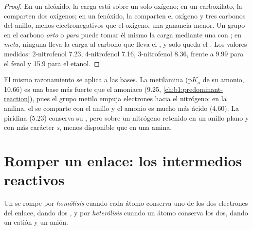 \begin{proof}
En un alcóxido, la carga está sobre un solo oxígeno; en un carboxilato,
la comparten dos oxígenos; en un fenóxido, la comparten el oxígeno y tres
carbonos del anillo, menos electronegativos que el oxígeno, una ganancia
menor. Un grupo  en el carbono \textit{orto} o \textit{para}
puede tomar él mismo la carga mediante una  con
; en \textit{meta}, ninguna  lleva la
carga al carbono que lleva el , y solo queda el . Los valores medidos: 2-nitrofenol 7.23, 4-nitrofenol 7.16,
3-nitrofenol 8.36, frente a 9.99 para el fenol y 15.9 para el etanol.
\end{proof}

El mismo razonamiento se aplica a las bases. La metilamina
($\mathrm{p}K_a$ de su amonio, 10.66) es una base más fuerte que el
amoniaco (9.25, \cref{ch:b1:predominant-reaction}), pues el grupo metilo
empuja electrones hacia el nitrógeno; en la anilina, el 
se comparte con el anillo y el amonio es mucho más ácido (4.60). La
piridina (5.23) conserva su , pero sobre un nitrógeno
retenido en un anillo plano y con más carácter \textit{s}, menos
disponible que en una amina.

\section{Romper un enlace: los intermedios reactivos}

\begin{definition}\label{def:b1:electronic-effects:cleavage}
Un  se rompe por \emph{homólisis} cuando cada
átomo conserva uno de los dos electrones del enlace, dando dos ,
y por \emph{heterólisis} cuando un átomo conserva los dos,
dando un catión y un anión.
\end{definition}

